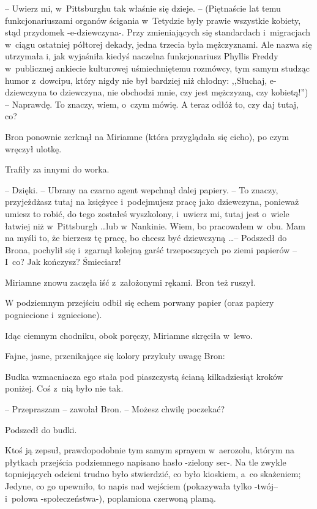 \documentclass[oneside,polish,11pt,rmheadings]{mwbk}
\begin{document}
-- Uwierz mi, w~Pittsburghu tak właśnie się dzieje. -- (Piętnaście lat temu funkcjonariuszami organów ścigania w~Tetydzie były prawie wszystkie kobiety, stąd przydomek -e-dziewczyna-. Przy zmieniających się standardach i~migracjach w~ciągu ostatniej półtorej dekady, jedna trzecia była mężczyznami. Ale nazwa się utrzymała i, jak wyjaśniła kiedyś naczelna funkcjonariusz Phyllis Freddy w~publicznej ankiecie kulturowej uśmiechniętemu rozmówcy, tym samym studząc humor z~dowcipu, który nigdy nie był bardziej niż chłodny: ,,Słuchaj, e-dziewczyna to dziewczyna, nie obchodzi mnie, czy jest mężczyzną, czy kobietą!'') -- Naprawdę. To znaczy, wiem, o~czym mówię. A teraz odłóż to, czy daj tutaj, co? 

Bron ponownie zerknął na Miriamne (która przyglądała się cicho), po czym wręczył ulotkę. 

Trafiły za innymi do worka. 

-- Dzięki. -- Ubrany na czarno agent wepchnął dalej papiery. -- To znaczy, przyjeżdżasz tutaj na księżyce i~podejmujesz pracę jako dziewczyna, ponieważ umiesz to robić, do tego zostałeś wyszkolony, i~uwierz mi, tutaj jest o~wiele łatwiej niż w~Pittsburgh \ldots  lub w~Nankinie. Wiem, bo pracowałem w~obu. Mam na myśli to, że bierzesz tę pracę, bo chcesz być dziewczyną \ldots  -- Podszedł do Brona, pochylił się i~zgarnął kolejną garść trzepoczących po ziemi papierów -- I~co? Jak kończysz?  Śmieciarz!

Miriamne znowu zaczęła iść z~założonymi rękami. Bron też ruszył. 

W podziemnym przejściu odbił się echem porwany papier (oraz papiery pogniecione i~zgniecione). 

Idąc ciemnym chodniku, obok poręczy, Miriamne skręciła w~lewo. 

Fajne, jasne, przenikające się kolory przykuły uwagę Bron: 

Budka wzmacniacza ego stała pod piaszczystą ścianą kilkadziesiąt kroków poniżej. Coś z~nią było nie tak. 

-- Przepraszam -- zawołał Bron. -- Możesz chwilę poczekać? 

Podszedł do budki. 

Ktoś ją zepsuł, prawdopodobnie tym samym sprayem w~aerozolu, którym na płytkach przejścia podziemnego napisano hasło -zielony ser-. Na tle zwykle topniejących odcieni trudno było stwierdzić, co było kioskiem, a~co skażeniem; Jedyne, co go upewniło, to napis nad wejściem (pokazywała tylko -twój-- i~połowa -społeczeństwa-), poplamiona czerwoną plamą. 
\end{document}
